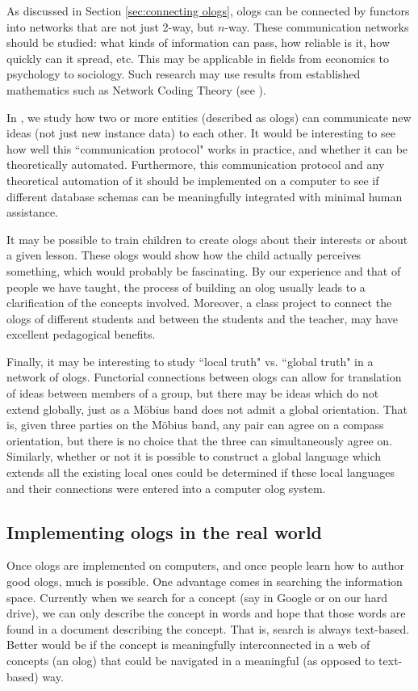 \documentclass{amsart}
\theoremstyle{remark}
\theoremstyle{definition}
\begin{document}
As discussed in Section \ref{sec:connecting ologs}, ologs can be connected by functors into networks that are not just 2-way, but $n$-way. These communication networks should be studied: what kinds of information can pass, how reliable is it, how quickly can it spread, etc. This may be applicable in fields from economics to psychology to sociology. Such research may use results from established mathematics such as Network Coding Theory (see \cite{YLC}).

In \cite{SA}, we study how two or more entities (described as ologs) can communicate new ideas (not just new instance data) to each other. It would be interesting to see how well this ``communication protocol" works in practice, and whether it can be theoretically automated. Furthermore, this communication protocol and any theoretical automation of it should be implemented on a computer to see if different database schemas can be meaningfully integrated with minimal human assistance. 

It may be possible to train children to create ologs about their interests or about a given lesson. These ologs would show how the child actually perceives something, which would probably be fascinating. By our experience and that of people we have taught, the process of building an olog usually leads to a clarification of the concepts involved. Moreover, a class project to connect the ologs of different students and between the students and the teacher, may have excellent pedagogical benefits. 

Finally, it may be interesting to study ``local truth" vs. \!\!\!``global truth" in a network of ologs. Functorial connections between ologs can allow for translation of ideas between members of a group, but there may be ideas which do not extend globally, just as a M\"{o}bius band does not admit a global orientation. That is, given three parties on the M\"{o}bius band, any pair can agree on a compass orientation, but there is no choice that the three can simultaneously agree on. Similarly, whether or not it is possible to construct a global language which extends all the existing local ones could be determined if these local languages and their connections were entered into a computer olog system.

\subsection{Implementing ologs in the real world}

Once ologs are implemented on computers, and once people learn how to author good ologs, much is possible. One advantage comes in searching the information space. Currently when we search for a concept (say in Google or on our hard drive), we can only describe the concept in words and hope that those words are found in a document describing the concept. That is, search is always text-based. Better would be if the concept is meaningfully interconnected in a web of concepts (an olog) that could be navigated in a meaningful (as opposed to text-based) way. 
\end{document}
